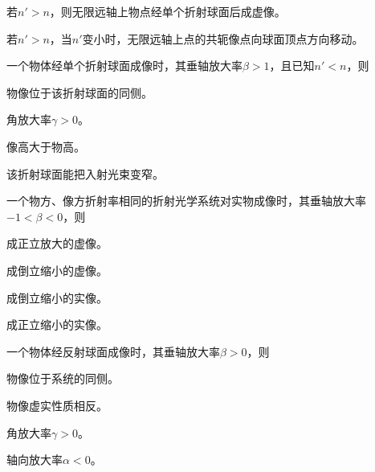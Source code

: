 \documentclass[standard, analysis, notocnum]{ExBook}
\newcommand{\answerarea}[1][8cm]{%
  \par\vspace{2mm}%
  \noindent{\color{themeColor!35}\rule{\linewidth}{0.4pt}}\par
  \noindent\begin{minipage}[t][#1][t]{\linewidth}\vspace{0pt}\end{minipage}\par
  \noindent{\color{themeColor!35}\rule{\linewidth}{0.4pt}}\par
}
\begin{document}
\begin{qitems}
\begin{bbox}
\par\noindent\hspace{2em}若$n'>n$，则无限远轴上物点经单个折射球面后成虚像。
\par\noindent\hspace{2em}若$n'>n$，当$n'$变小时，无限远轴上点的共轭像点向球面顶点方向移动。
\answerarea[3.5cm]
\end{bbox}
\begin{bbox}
\qitem 一个物体经单个折射球面成像时，其垂轴放大率$\beta >1$，且已知$n'<n$，则
\par\noindent\hspace{2em}物像位于该折射球面的同侧。
\par\noindent\hspace{2em}角放大率$\gamma >0$。
\par\noindent\hspace{2em}像高大于物高。
\par\noindent\hspace{2em}该折射球面能把入射光束变窄。
\answerarea[3.5cm]
\end{bbox}
\begin{bbox}
\qitem 一个物方、像方折射率相同的折射光学系统对实物成像时，其垂轴放大率$-1<\beta <0$，则
\par\noindent\hspace{2em}成正立放大的虚像。
\par\noindent\hspace{2em}成倒立缩小的虚像。
\par\noindent\hspace{2em}成倒立缩小的实像。
\par\noindent\hspace{2em}成正立缩小的实像。
\answerarea[3.5cm]
\end{bbox}
\begin{bbox}
\qitem 一个物体经反射球面成像时，其垂轴放大率$\beta >0$，则
\par\noindent\hspace{2em}物像位于系统的同侧。
\par\noindent\hspace{2em}物像虚实性质相反。
\par\noindent\hspace{2em}角放大率$\gamma >0$。
\par\noindent\hspace{2em}轴向放大率$\alpha <0$。
\answerarea[3.5cm]
\end{bbox}

\end{qitems}
\end{document}
